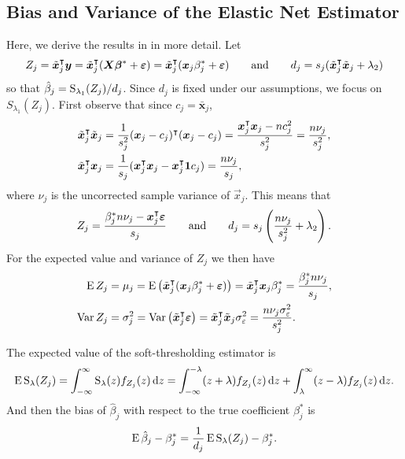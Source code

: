 \subsection{Bias and Variance of the Elastic Net Estimator}
\label{sec:bias-var-deriv}

Here, we derive the results in  in more detail. Let
\[
  {Z_j} = \tilde{\boldsymbol{x}}_j^\intercal \boldsymbol{y} = \tilde{\boldsymbol{x}}_j^\intercal(\boldsymbol{X}\boldsymbol{\beta}^* + \boldsymbol{\varepsilon}) = \tilde{\boldsymbol{x}}_j^\intercal (\boldsymbol{x}_j\beta_j^* + \boldsymbol{\varepsilon})
  \qquad
  \text{and}
  \qquad
  d_j = s_j(\tilde{\boldsymbol{x}}_j^\intercal \tilde{\boldsymbol{x}}_j + \lambda_2)
\]
so that \(\hat{\beta}_j = \operatorname{S}_{\lambda_1}({Z_j})/d_j\). Since \(d_j\) is fixed under our
assumptions, we focus on \(S_{\lambda_1}({Z_j})\). First observe that since \(c_j =
\bar{\bm{x}}_j\),
\[
  \begin{aligned}
    \tilde{\boldsymbol{x}}_j^\intercal \tilde{\boldsymbol{x}}_j & = \frac{1}{s_j^2}(\boldsymbol{x}_j - c_j)^\intercal (\boldsymbol{x}_j - c_j) = \frac{\boldsymbol{x}_j^\intercal\boldsymbol{x}_j - nc_j^2}{s^2_j} = \frac{n \nu_j}{s_j^2}, \\
    \tilde{\boldsymbol{x}}_j^\intercal \boldsymbol{x}_j         & = \frac{1}{s_j}(\boldsymbol{x}_j^\intercal \boldsymbol{x}_j - \boldsymbol{x}_j^\intercal \boldsymbol{1} c_j) = \frac{n \nu_j}{s_j},
  \end{aligned}
\]
where \(\nu_j\) is the uncorrected sample variance of \(\vec{x}_j\). This means that
\begin{equation}
  {Z_j} = \frac{\beta_j^* n \nu_j- \boldsymbol{x}_j^\intercal \boldsymbol{\varepsilon}}{s_j}
  \qquad\text{and}\qquad
  d_j = s_j\left(\frac{n \nu_j}{s_j^2} + \lambda_2\right).
\end{equation}
For the expected value and variance of \({Z_j}\) we then have
\begin{align*}
  \operatorname{E} {Z_j}   & = \mu_j = \operatorname{E} \left( \tilde{\boldsymbol{x}}_j^\intercal (\boldsymbol{x}_j\beta^*_j + \boldsymbol{\varepsilon}) \right)  = \tilde{\boldsymbol{x}}_j^\intercal\boldsymbol{x}_j \beta^*_j = \frac{\beta_j^* n \nu_j}{s_j},            \\
  \operatorname{Var} {Z_j} & = \sigma_j^2 = \operatorname{Var}\left(\tilde{\boldsymbol{x}}_j ^\intercal \boldsymbol{\varepsilon}\right) = \tilde{\boldsymbol{x}}_j^\intercal \tilde{\boldsymbol{x}}_j\sigma_\varepsilon^2 = \frac{n\nu_j\sigma_\varepsilon^2}{s_j^2}.
\end{align*}

The expected value of the soft-thresholding estimator is
\begin{equation*}
  \operatorname{E} \operatorname{S}_\lambda({Z_j}) = \int_{-\infty}^\infty \operatorname{S}_\lambda(z) f_{Z_j}(z) \mathop{}\!\mathrm{d} z
  = \int_{-\infty}^{-\lambda}(z + \lambda)f_{Z_j}(z) \mathop{}\!\mathrm{d} z + \int_{\lambda}^\infty (z - \lambda)f_{Z_j}(z) \mathop{}\!\mathrm{d} z.
\end{equation*}
And then the bias of \(\hat\beta_j\) with respect to the true coefficient \(\beta_j^*\) is
\begin{equation*}
  \operatorname{E} \hat\beta_j - \beta_j^* = \frac{1}{d_j}\operatorname{E} \operatorname{S}_\lambda({Z_j}) - \beta^*_j.
\end{equation*}

